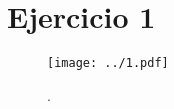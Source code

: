 \section*{Ejercicio 1}
\graphicspath{{/home/cabre/Desktop/Redes_Neuronales/Redes_Neuronales_IB/Practica_5/Figuras}}



\begin{figure}
    \centering
    \texttt{[image: ../1.pdf]}
    \caption{.}
    \label{fig:01}
\end{figure}